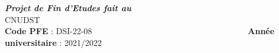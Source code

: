 \documentclass[a4paper, oneside, 12pt, final]{extreport}
\newcommand{\studyDepartment} {%
  CNUDST %
}
\newcommand{\juryPresident} {%
  \textbf{Encadrant entreprise}: \textsc{Mr. CHOKRI BEN ROMDHANE}
}
\newcommand{\juryMemberOne} {%
  \textbf{Encadrant ISET}: \textsc{Mr. Bassem BOUGHZELA}
}
\begin{document}
\begin{titlepage}
\begin{center}
\begin{tabular}{p{0.3\linewidth} p{0.15\linewidth}}
\end{tabular}



\textbf{\textit{Projet de Fin d'Etudes fait au}}\\

\studyDepartment\\
\vspace{25pt}
\textbf{Code PFE} : DSI-22-08~~~~~~~~~~~~~~~~~~~~~~~~~~~~~~~~~~~~~
\textbf{Année universitaire} : 2021/2022
\end{center}
\end{titlepage}

%


\end{document}
